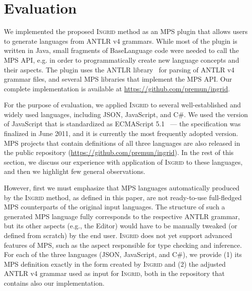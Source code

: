 \section{Evaluation}
\label{sect:EVAL}

We implemented the proposed \textsc{Ingrid} method as an MPS plugin that allows users to generate languages from ANTLR v4 grammars.
While most of the plugin is written in Java, small fragments of BaseLanguage code were needed to call  the MPS API,   e.g. in order to programmatically create new language concepts and their aspects.
The plugin uses the ANTLR library~\cite{ref:ANTLR} for parsing of ANTLR v4 grammar files, and several MPS libraries that implement the MPS API.
Our complete implementation is available at \url{https://github.com/premun/ingrid}.

For the purpose of evaluation, we applied \textsc{Ingrid} to several well-established and widely used languages, including JSON, JavaScript, and C\#.
We used the version of JavaScript that is standardized as ECMAScript 5.1~\cite{ref:ECMASCRIPT51} --- the specification was finalized in June 2011, and it is currently the most frequently adopted version.
MPS projects that contain definitions of all three languages are also released in the public repository (\url{https://github.com/premun/ingrid}).
In the rest of this section, we discuss our experience with application of \textsc{Ingrid} to these languages, and then we highlight few general observations.

However, first we must emphasize that MPS languages automatically produced by the \textsc{Ingrid} method, as defined in this paper, are not ready-to-use full-fledged MPS counterparts of the original input languages.
The structure of such a generated MPS language fully corresponds to the respective ANTLR grammar, but its other aspects (e.g., the Editor) would have to be manually tweaked (or defined from scratch) by the end user.
\textsc{Ingrid} does not yet support advanced features of MPS, such as the aspect responsible for type checking and inference.
For each of the three languages (JSON, JavaScript, and C\#), we provide (1) its MPS definition exactly in the form created by \textsc{Ingrid} and (2) the adjusted ANTLR v4 grammar used as input for \textsc{Ingrid}, both in the repository that contains also our implementation.


